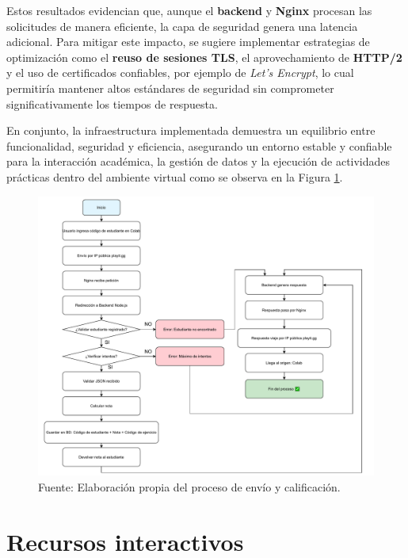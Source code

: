 \documentclass[letter,oneside,12pt,spanish]{report}
\begin{document}
Estos resultados evidencian que, aunque el \textbf{backend} y \textbf{Nginx} procesan las solicitudes de manera eficiente, la capa de seguridad genera una latencia adicional. Para mitigar este impacto, se sugiere implementar estrategias de optimización como el \textbf{reuso de sesiones TLS}, el aprovechamiento de \textbf{HTTP/2} y el uso de certificados confiables, por ejemplo de \textit{Let’s Encrypt}, lo cual permitiría mantener altos estándares de seguridad sin comprometer significativamente los tiempos de respuesta.

En conjunto, la infraestructura implementada demuestra un equilibrio entre funcionalidad, seguridad y eficiencia, asegurando un entorno estable y confiable para la interacción académica, la gestión de datos y la ejecución de actividades prácticas dentro del ambiente virtual como se observa en la Figura \ref{fig:DF}.

\newpage

\begin{figure}[ht]
	\centering
	\includegraphics[width=1\textwidth]{Figs/Diagrama_Flujo.pdf}
	\label{fig:DF}
	\\Fuente: Elaboración propia del proceso de envío y calificación.
\end{figure}

\section{Recursos interactivos}
\end{document}
